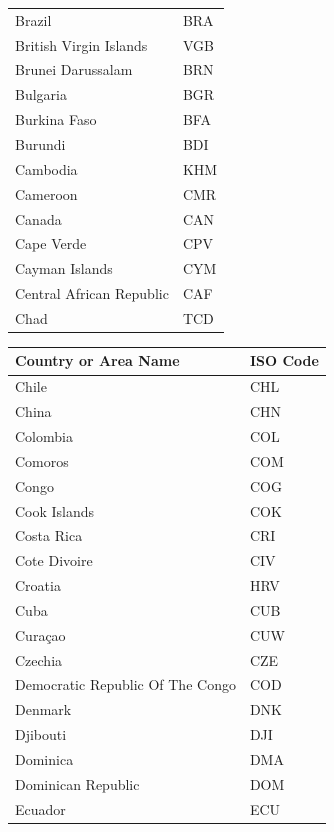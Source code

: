 \documentclass{report}
\begin{document}
\begin{center}
\begin{minipage}{0.46\textwidth}
\begin{tabular}{|p{10.5em}|p{6em}|}
            Brazil & BRA\\
            British Virgin Islands & VGB\\
            Brunei Darussalam & BRN\\
            Bulgaria & BGR\\
            Burkina Faso & BFA\\
            Burundi & BDI\\
            Cambodia & KHM\\
            Cameroon & CMR\\
            Canada & CAN\\
            Cape Verde & CPV\\
            Cayman Islands & CYM\\
            Central African Republic & CAF\\
            Chad & TCD\\
            \hline
        \end{tabular}
    \end{minipage}
    \hfill
    \begin{minipage}{0.46\textwidth}
        \begin{tabular}{|p{10.5em}|p{6em}|}
            \hline
            Country or Area Name & ISO Code\\
            \hline
            Chile & CHL\\
            China & CHN\\
            Colombia & COL\\
            Comoros & COM\\
            Congo & COG\\
            Cook Islands & COK\\
            Costa Rica & CRI\\
            Cote Divoire & CIV\\
            Croatia & HRV\\
            Cuba & CUB\\
            Curaçao & CUW\\
            Czechia & CZE\\
            Democratic Republic Of The Congo & COD\\
            Denmark & DNK\\
            Djibouti & DJI\\
            Dominica & DMA\\
            Dominican Republic & DOM\\
            Ecuador & ECU\\

\end{tabular}
\end{minipage}
\end{center}
\end{document}
